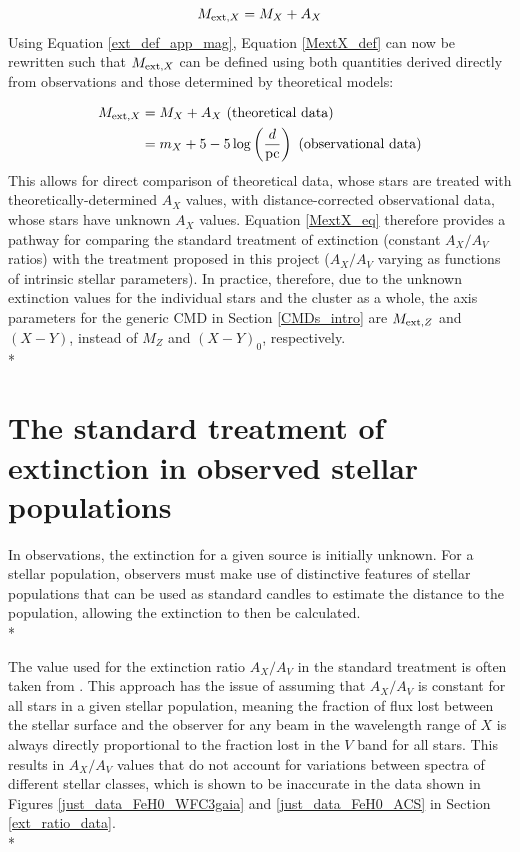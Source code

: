 \documentclass[12pt, a4paper]{report}
\begin{document}
\begin{equation}
M_{\textnormal{ext},X} = M_{X} + A_{X}
\label{MextX_def}
\end{equation}
Using Equation \ref{ext_def_app_mag}, Equation \ref{MextX_def} can now be rewritten such that $M_{\textnormal{ext},X}$ can be defined using both quantities derived directly from observations and those determined by theoretical models:

\begin{align}
\begin{split}
M_{\textnormal{ext},X} &= M_{X} + A_{X} \textnormal{ (theoretical data)}\\
 &= m_{X} + 5 - 5\log\left(\frac{d}{\textnormal{pc}}\right) \textnormal{ (observational data)}
\end{split}
\label{MextX_eq}
\end{align}
This allows for direct comparison of theoretical data, whose stars are treated with theoretically-determined $A_{X}$ values, with distance-corrected observational data, whose stars have unknown $A_{X}$ values. Equation \ref{MextX_eq} therefore provides a pathway for comparing the standard treatment of extinction (constant $A_{X}/A_{V}$ ratios) with the treatment proposed in this project ($A_{X}/A_{V}$ varying as functions of intrinsic stellar parameters). In practice, therefore, due to the unknown extinction values for the individual stars and the cluster as a whole, the axis parameters for the generic CMD in Section \ref{CMDs_intro} are $M_{\textnormal{ext},Z}$ and $(X-Y)$, instead of $M_{Z}$ and $(X-Y)_{0}$, respectively.\\*

\section{The standard treatment of extinction in observed stellar populations} \label{standard_ext}

In observations, the extinction for a given source is initially unknown. For a stellar population, observers must make use of distinctive features of stellar populations that can be used as standard candles to estimate the distance to the population, allowing the extinction to then be calculated. \\*

The value used for the extinction ratio $A_{X}/A_{V}$ in the standard treatment is often taken from \cite{1985ApJ...288..618R}. This approach has the issue of assuming that $A_{X}/A_{V}$ is constant for all stars in a given stellar population, meaning the fraction of flux lost between the stellar surface and the observer for any beam in the wavelength range of $X$ is always directly proportional to the fraction lost in the $V$ band for all stars. This results in  $A_{X}/A_{V}$ values that do not account for variations between spectra of different stellar classes, which is shown to be inaccurate in the data shown in Figures \ref{just_data_FeH0_WFC3gaia} and \ref{just_data_FeH0_ACS} in Section \ref{ext_ratio_data}.\\*
\end{document}
